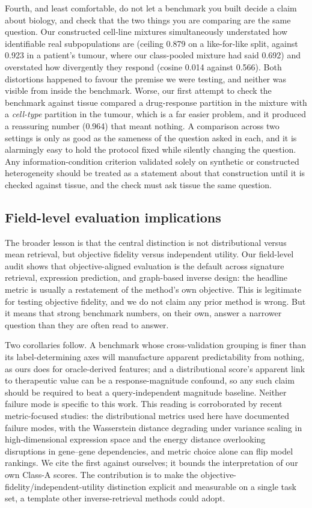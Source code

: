 \documentclass[11pt,letterpaper]{article}
\begin{document}
Fourth, and least comfortable, do not let a benchmark you built decide a claim about
biology, and check that the two things you are comparing are the same question. Our constructed
cell-line mixtures simultaneously understated how identifiable real subpopulations are (ceiling
0.879 on a like-for-like split, against 0.923 in a patient's tumour, where our class-pooled
mixture had said 0.692) and overstated how divergently they respond (cosine 0.014 against 0.566).
Both distortions happened to favour the premise we were testing, and neither was visible from
inside the benchmark. Worse, our first attempt to check the benchmark against tissue compared a
drug-response partition in the mixture with a \emph{cell-type} partition in the tumour, which is a
far easier problem, and it produced a reassuring number (0.964) that meant nothing. A comparison
across two settings is only as good as the sameness of the question asked in each, and it is
alarmingly easy to hold the protocol fixed while silently changing the question. Any
information-condition criterion validated solely on synthetic or constructed heterogeneity should
be treated as a statement about that construction until it is checked against tissue, and the check
must ask tissue the same question.

\subsection*{Field-level evaluation implications}

The broader lesson is that the central distinction is not distributional versus mean retrieval, but
objective fidelity versus independent utility. Our field-level audit shows that
objective-aligned evaluation is the default across signature retrieval, expression
prediction, and graph-based inverse design: the headline metric is usually a restatement of
the method's own objective. This is legitimate for testing objective fidelity, and we do not
claim any prior method is wrong. But it means that strong benchmark numbers, on their own,
answer a narrower question than they are often read to answer.

Two corollaries follow. A benchmark whose cross-validation grouping is finer than its
label-determining axes will manufacture apparent predictability from nothing, as ours does for
oracle-derived features\cite{Leakage,PseudoRep}; and a distributional score's apparent link to therapeutic value can be a
response-magnitude confound, so any such claim should be required to beat a query-independent
magnitude baseline. Neither failure mode is specific to this work. This reading is corroborated by
recent metric-focused studies: the distributional metrics used here have documented failure modes,
with the Wasserstein distance degrading under variance scaling in high-dimensional expression space
and the energy distance overlooking disruptions in gene--gene dependencies\cite{ref16}, and metric
choice alone can flip model rankings\cite{ref17}. We cite the first against ourselves; it bounds the
interpretation of our own Class-A scores. The contribution is to make the
objective-fidelity/independent-utility distinction explicit and measurable on a single task set, a
template other inverse-retrieval methods could adopt.
\end{document}
